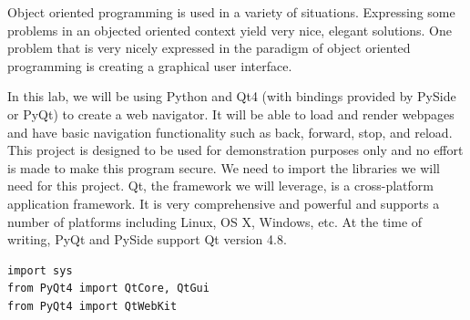 
Object oriented programming is used in a variety of situations.
Expressing some problems in an objected oriented context yield very nice, elegant solutions.
One problem that is very nicely expressed in the paradigm of object oriented programming is creating a graphical user interface.

In this lab, we will be using Python and Qt4 (with bindings provided by PySide or PyQt) to create a web navigator.
It will be able to load and render webpages and have basic navigation functionality such as
back, forward, stop, and reload.  This project is designed to be used for demonstration purposes only and no effort is made to make this program secure.
We need to import the libraries we will need for this project.  Qt, the framework we will leverage, is a cross-platform application framework.  It is very comprehensive and powerful and supports a number of platforms including Linux, OS X, Windows, etc.  At the time of writing, PyQt and PySide support Qt version 4.8.
\begin{lstlisting}
import sys
from PyQt4 import QtCore, QtGui
from PyQt4 import QtWebKit
\end{lstlisting}

